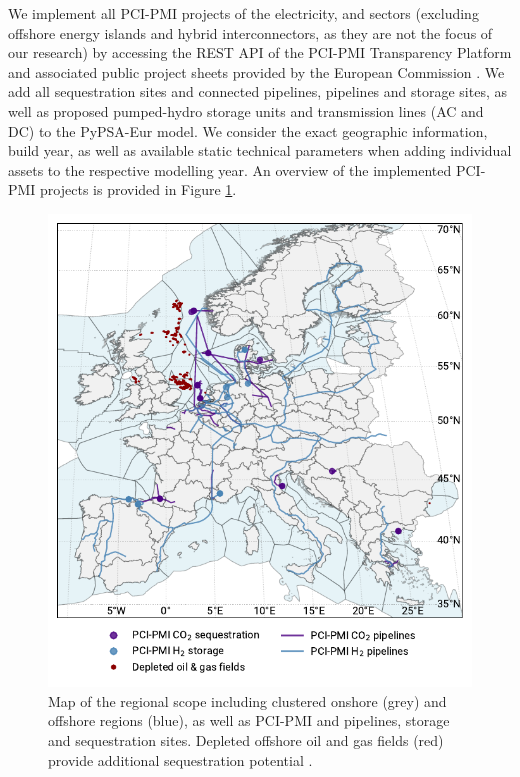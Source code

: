 \documentclass[final,5p,times,twocolumn,sort&compress]{elsarticle}
\begin{document}
We implement all PCI-PMI projects of the electricity,  and  sectors (excluding offshore energy islands and hybrid interconnectors, as they are not the focus of our research) by accessing the REST API of the PCI-PMI Transparency Platform and associated public project sheets provided by the European Commission \cite{europeancommissionPCIPMITransparencyPlatform2024}. We add all  sequestration sites and connected pipelines,  pipelines and storage sites, as well as proposed pumped-hydro storage units and transmission lines (AC and DC) to the PyPSA-Eur model. We consider the exact geographic information, build year, as well as available static technical parameters when adding individual assets to the respective modelling year. An overview of the implemented PCI-PMI projects is provided in Figure \ref{fig:regional_scope_map}.
\begin{figure}[htbp]
  \centering
  \includegraphics[width=\linewidth]{map_adm_pcipmi}
  \caption{Map of the regional scope including clustered onshore (grey) and offshore regions (blue), as well as PCI-PMI  and  pipelines, storage and sequestration sites. Depleted offshore oil and gas fields (red) provide additional  sequestration potential \cite{hofmannH2CO2Network2025}.}
  \label{fig:regional_scope_map}
\end{figure}
\end{document}
